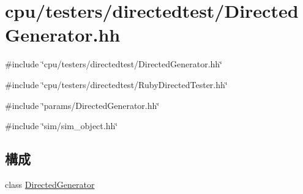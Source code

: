 \hypertarget{DirectedGenerator_8hh}{
\section{cpu/testers/directedtest/DirectedGenerator.hh}
\label{DirectedGenerator_8hh}
}
{\ttfamily \#include \char`\"{}cpu/testers/directedtest/DirectedGenerator.hh\char`\"{}}\par
{\ttfamily \#include \char`\"{}cpu/testers/directedtest/RubyDirectedTester.hh\char`\"{}}\par
{\ttfamily \#include \char`\"{}params/DirectedGenerator.hh\char`\"{}}\par
{\ttfamily \#include \char`\"{}sim/sim\_\-object.hh\char`\"{}}\par
\subsection*{構成}
\begin{DoxyCompactItemize}
\item 
class \hyperlink{classDirectedGenerator}{DirectedGenerator}
\end{DoxyCompactItemize}
